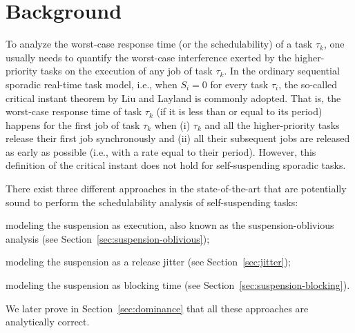 \section{Background}
\label{sec:existing-analyses}

To analyze the worst-case response time (or the schedulability) of a task $\tau_k$, one usually needs to quantify the worst-case interference exerted by the higher-priority tasks on the execution of any job of task $\tau_k$. In the ordinary sequential sporadic real-time task model, i.e., when $S_i=0$ for every task $\tau_i$, the so-called critical instant theorem by Liu and Layland \cite{Liu_1973} is commonly adopted. That is, the worst-case response time of task $\tau_k$ (if it is less than or equal to its period) happens for the first job of task $\tau_k$ when (i) $\tau_k$ and all the higher-priority tasks release their first job synchronously and (ii) all their subsequent jobs are released as early as possible (i.e., with a rate equal to their period).  However,  this definition of the
critical instant does not hold for self-suspending sporadic tasks.  



There exist three different approaches in the state-of-the-art 
that are potentially sound to perform the schedulability analysis of self-suspending tasks:
\begin{compactitem}
\item modeling the suspension as execution, also known as the suspension-oblivious analysis (see Section~\ref{sec:suspension-oblivious});
\item modeling the suspension as a release jitter (see Section~\ref{sec:jitter});
\item modeling the suspension as blocking time (see Section~\ref{sec:suspension-blocking}).
\end{compactitem}
We later prove in Section~\ref{sec:dominance} that all these approaches are analytically correct. 

